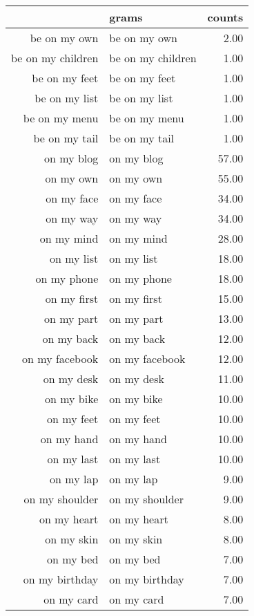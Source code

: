 \begin{table}[ht]
\centering
\begin{tabular}{rlr}
  \hline
 & grams & counts \\ 
  \hline
be on my own & be on my own & 2.00 \\ 
  be on my children & be on my children & 1.00 \\ 
  be on my feet & be on my feet & 1.00 \\ 
  be on my list & be on my list & 1.00 \\ 
  be on my menu & be on my menu & 1.00 \\ 
  be on my tail & be on my tail & 1.00 \\ 
  on my blog & on my blog & 57.00 \\ 
  on my own & on my own & 55.00 \\ 
  on my face & on my face & 34.00 \\ 
  on my way & on my way & 34.00 \\ 
  on my mind & on my mind & 28.00 \\ 
  on my list & on my list & 18.00 \\ 
  on my phone & on my phone & 18.00 \\ 
  on my first & on my first & 15.00 \\ 
  on my part & on my part & 13.00 \\ 
  on my back & on my back & 12.00 \\ 
  on my facebook & on my facebook & 12.00 \\ 
  on my desk & on my desk & 11.00 \\ 
  on my bike & on my bike & 10.00 \\ 
  on my feet & on my feet & 10.00 \\ 
  on my hand & on my hand & 10.00 \\ 
  on my last & on my last & 10.00 \\ 
  on my lap & on my lap & 9.00 \\ 
  on my shoulder & on my shoulder & 9.00 \\ 
  on my heart & on my heart & 8.00 \\ 
  on my skin & on my skin & 8.00 \\ 
  on my bed & on my bed & 7.00 \\ 
  on my birthday & on my birthday & 7.00 \\ 
  on my card & on my card & 7.00 \\ 

\end{tabular}
\end{table}
